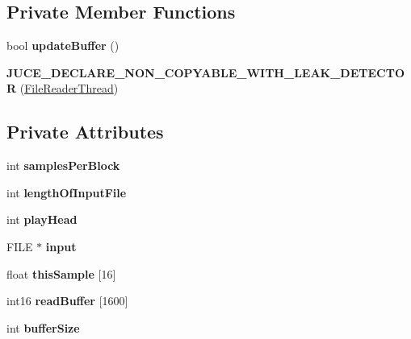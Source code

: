 \subsection*{Private Member Functions}
\begin{DoxyCompactItemize}
\item 
\hypertarget{classFileReaderThread_a9b29cc5f5357f1f3420ce056e74080e2}{bool {\bfseries update\-Buffer} ()}\label{classFileReaderThread_a9b29cc5f5357f1f3420ce056e74080e2}

\item 
\hypertarget{classFileReaderThread_a315e26b3292c7367955880c796697a77}{{\bfseries J\-U\-C\-E\-\_\-\-D\-E\-C\-L\-A\-R\-E\-\_\-\-N\-O\-N\-\_\-\-C\-O\-P\-Y\-A\-B\-L\-E\-\_\-\-W\-I\-T\-H\-\_\-\-L\-E\-A\-K\-\_\-\-D\-E\-T\-E\-C\-T\-O\-R} (\hyperlink{classFileReaderThread}{File\-Reader\-Thread})}\label{classFileReaderThread_a315e26b3292c7367955880c796697a77}

\end{DoxyCompactItemize}
\subsection*{Private Attributes}
\begin{DoxyCompactItemize}
\item 
\hypertarget{classFileReaderThread_a056a08c6831bcb42f4861af27731bc21}{int {\bfseries samples\-Per\-Block}}\label{classFileReaderThread_a056a08c6831bcb42f4861af27731bc21}

\item 
\hypertarget{classFileReaderThread_ae2eb051836340cf9c11ba910073c53e8}{int {\bfseries length\-Of\-Input\-File}}\label{classFileReaderThread_ae2eb051836340cf9c11ba910073c53e8}

\item 
\hypertarget{classFileReaderThread_a85b607e8d2a3d9031860e8d90a057f73}{int {\bfseries play\-Head}}\label{classFileReaderThread_a85b607e8d2a3d9031860e8d90a057f73}

\item 
\hypertarget{classFileReaderThread_aba27b94f0b117b3e7e15314cb9b6d743}{F\-I\-L\-E $\ast$ {\bfseries input}}\label{classFileReaderThread_aba27b94f0b117b3e7e15314cb9b6d743}

\item 
\hypertarget{classFileReaderThread_ae5b116d0f10ce1d6c44c86f275e42628}{float {\bfseries this\-Sample} \mbox{[}16\mbox{]}}\label{classFileReaderThread_ae5b116d0f10ce1d6c44c86f275e42628}

\item 
\hypertarget{classFileReaderThread_ab6abb9e073dad1cf02de607dcfdc912e}{int16 {\bfseries read\-Buffer} \mbox{[}1600\mbox{]}}\label{classFileReaderThread_ab6abb9e073dad1cf02de607dcfdc912e}

\item 
\hypertarget{classFileReaderThread_a0c0758a5778f77a4d5d49fba73ac74b6}{int {\bfseries buffer\-Size}}\label{classFileReaderThread_a0c0758a5778f77a4d5d49fba73ac74b6}

\end{DoxyCompactItemize}
